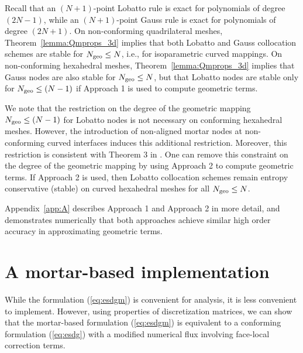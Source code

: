 \documentclass{svjour3}                     %
\renewcommand{\note}[1]{{\color{blue}{#1}}}
\begin{document}
Recall that an $(N+1)$-point Lobatto rule is exact for polynomials of degree $(2N-1)$, while an $(N+1)$-point Gauss rule is exact for polynomials of degree $(2N+1)$.  On non-conforming quadrilateral meshes, Theorem~\ref{lemma:Qmprops_3d} implies that both Lobatto and Gauss collocation schemes are stable for $N_{\rm geo}\leq N$, i.e., for isoparametric curved mappings.  On non-conforming hexahedral meshes, Theorem~\ref{lemma:Qmprops_3d} implies that Gauss nodes are also stable for $N_{\rm geo}\leq N$, but that Lobatto nodes are stable only for $N_{\rm geo} \leq (N-1)$ if Approach 1 \cite{kopriva2006metric} is used to compute geometric terms.  

We note that the restriction on the degree of the geometric mapping $N_{\rm geo} \leq (N-1)$ for Lobatto nodes is not necessary on conforming hexahedral meshes.  However, the introduction of non-aligned mortar nodes at non-conforming curved interfaces induces this additional restriction.  Moreover, this restriction is consistent with Theorem 3 in \cite{fernandez2019entropy}.  One can remove this constraint on the degree of the geometric mapping by using Approach 2 \cite{kozdon2018energy} to compute geometric terms.  If Approach 2 is used, then Lobatto collocation schemes remain entropy conservative (stable) on curved hexahedral meshes for all $N_{\rm geo} \leq N$.  

Appendix~\ref{app:A} describes Approach 1 \cite{kopriva2006metric} and Approach 2 \cite{kozdon2018energy} in more detail, and demonstrates numerically that both approaches achieve similar high order accuracy in approximating geometric terms.



\section{A mortar-based implementation}

While the formulation (\ref{eq:esdgm}) is convenient for analysis, it is less convenient to implement.  However, using properties of discretization matrices, we can show that the mortar-based formulation (\ref{eq:esdgm}) is equivalent to a conforming formulation (\ref{eq:esdg}) with a modified numerical flux involving face-local correction terms.  
\end{document}
